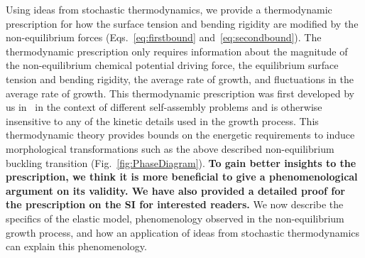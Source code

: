 \documentclass[amsmath,preprintnumbers,10pt,nofootinbib,prl,twocolumn]{revtex4-1}
\begin{document}
Using ideas from stochastic thermodynamics, we provide a thermodynamic prescription for how the surface tension and bending rigidity are modified by the non-equilibrium forces (Eqs.~\ref{eq:firstbound} and~\ref{eq:secondbound}). The thermodynamic prescription only requires information about the magnitude of the non-equilibrium chemical potential driving force, the equilibrium surface tension and bending rigidity, the average rate of growth, and fluctuations in the average rate of growth. This thermodynamic prescription was first developed by us in~\cite{Nguyen2016} in the context of different self-assembly problems and is otherwise insensitive to any of the kinetic details used in the growth process. This thermodynamic theory provides bounds on the energetic requirements to induce morphological transformations such as the above described non-equilibrium buckling transition (Fig.~\ref{fig:PhaseDiagram}). \textbf{To gain better insights to the prescription, we think it is more beneficial to give a phenomenological argument on its validity. We have also provided a detailed proof for the prescription on the SI for interested readers.}
We now describe the specifics of the elastic model, phenomenology observed in the non-equilibrium growth process, and how an application of ideas from stochastic thermodynamics can explain this phenomenology. 

\end{document}
